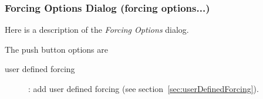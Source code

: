 \subsubsection{Forcing Options Dialog (forcing options...)}\label{sec:forcingOptions}

Here is a description of the {\em Forcing Options} dialog.

\noindent The push button options are
\begin{description}
  \item[\qquad user defined forcing] : add user defined forcing (see section~\ref{sec:userDefinedForcing}). 
\end{description}
